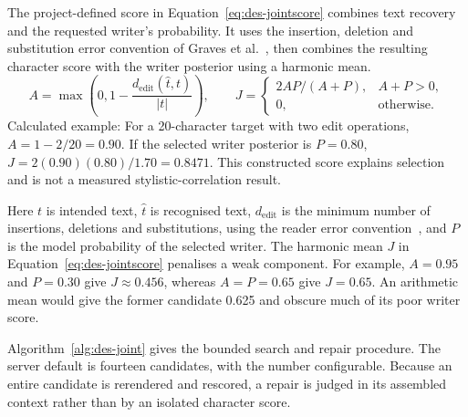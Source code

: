 The project-defined score in Equation~\ref{eq:des-jointscore} combines text recovery and the requested writer's probability. It uses the insertion, deletion and substitution error convention of Graves et al.~\cite[PDF p.~2, Sec.~2.1]{graves2006}, then combines the resulting character score with the writer posterior using a harmonic mean.
\begin{equation}
A=\max\left(0,1-\frac{d_{\mathrm{edit}}(\widehat t,t)}{|t|}\right),\qquad
J=\begin{cases}2AP/(A+P),&A+P>0,\\0,&\text{otherwise}.\end{cases}
\label{eq:des-jointscore}
\end{equation}
Calculated example: For a 20-character target with two edit operations, $A=1-2/20=0.90$. If the selected writer posterior is $P=0.80$, $J=2(0.90)(0.80)/1.70=0.8471$. This constructed score explains selection and is not a measured stylistic-correlation result.

Here $t$ is intended text, $\widehat t$ is recognised text, $d_{\mathrm{edit}}$ is the minimum number of insertions, deletions and substitutions, using the reader error convention~\cite[PDF p.~2, Sec.~2.1]{graves2006}, and $P$ is the model probability of the selected writer. The harmonic mean $J$ in Equation~\ref{eq:des-jointscore} penalises a weak component. For example, $A=0.95$ and $P=0.30$ give $J\approx0.456$, whereas $A=P=0.65$ give $J=0.65$. An arithmetic mean would give the former candidate 0.625 and obscure much of its poor writer score.

Algorithm~\ref{alg:des-joint} gives the bounded search and repair procedure. The server default is fourteen candidates, with the number configurable. Because an entire candidate is rerendered and rescored, a repair is judged in its assembled context rather than by an isolated character score.


